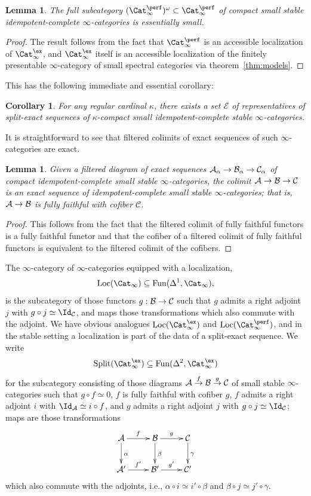 \documentclass{amsart}
\renewcommand{\to}{\mathchoice{\longrightarrow}{\rightarrow}{\rightarrow}{\rightarrow}}
\let\catsymbfont\mathcal
\newcommand{\aA}{{\catsymbfont{A}}}
\newcommand{\aB}{{\catsymbfont{B}}}
\newcommand{\aC}{{\catsymbfont{C}}}
\newcommand{\aE}{{\catsymbfont{E}}}
\newcommand{\stabcat}{\Cat_\i^{\ex}}
\newcommand{\idemstabcat}{\Cat_\i^{\perf}}
\newcommand{\Fun}{\mathrm{Fun}} %
\renewcommand{\i}{\infty}
\numberwithin{equation}{section}
\newtheorem{corollary}[equation]{Corollary}
\newtheorem{lemma}[equation]{Lemma}
\theoremstyle{definition}
\begin{document}
\begin{lemma}\label{lem:small}
The full subcategory
$(\idemstabcat)^{\omega} \subset \idemstabcat$ of compact small stable
idempotent-complete $\i$-categories is essentially small.
\end{lemma}

\begin{proof}
The result follows from the fact that $\idemstabcat$ is an accessible
localization of $\stabcat$, and $\stabcat$ itself is an
accessible localization of the finitely presentable $\i$-category of
small spectral categories via theorem~\ref{thm:models}.
\end{proof}

This has the following immediate and essential corollary:

\begin{corollary}\label{cor:setrep}
For any regular cardinal $\kappa$, there exists a set $\aE$ of
representatives of split-exact sequences of $\kappa$-compact small
idempotent-complete stable $\i$-categories.
\end{corollary}

It is straightforward to see that filtered colimits of exact sequences of such
$\i$-categories are exact. 

\begin{lemma}
Given a filtered diagram of exact sequences $\aA_\alpha\to \aB_\alpha\to
\aC_\alpha$ of compact idempotent-complete small stable $\i$-categories,
the colimit $\aA\to \aB\to \aC$ is an exact sequence of idempotent-complete
small stable $\i$-categories; that is, $\aA\to \aB$ is fully faithful with
cofiber $\aC$.
\end{lemma}

\begin{proof}
This follows from the fact that the filtered colimit of fully faithful
functors is a fully faithful functor and that the cofiber of a
filtered colimit of fully faithful functors is equivalent to the
filtered colimit of the cofibers.
\end{proof}

The $\i$-category of $\i$-categories equipped with a localization,
\[
\mathrm{Loc}(\Cat_\i)\subseteq\Fun(\Delta^1,\Cat_\i),
\]
is the subcategory of those functors $g:\aB\to\aC$ such that $g$ admits a right adjoint $j$ with $g\circ j\simeq\Id_\aC$, and maps those transformations which also commute with the adjoint.
We have obvious analogues $\mathrm{Loc}(\stabcat)$ and $\mathrm{Loc}(\idemstabcat)$, and in the stable setting a localization is part of the data of a split-exact sequence.
We write
\[
\mathrm{Split}(\stabcat)\subseteq\Fun(\Delta^2,\stabcat)
\]
for the subcategory consisting of those diagrams $\aA\overset{f}{\to}\aB\overset{g}{\to}\aC$ of small stable $\i$-categories such that $g\circ f\simeq 0$, $f$ is fully faithful with cofiber $g$, $f$ admits a right adjoint $i$ with $\Id_\aA\simeq i\circ f$, and $g$ admits a right adjoint $j$ with $g\circ j\simeq\Id_\aC$; maps are those transformations
\[
\xymatrix{
\aA\ar[r]^f\ar[d]^\alpha & \aB\ar[r]^g\ar[d]^\beta & \aC\ar[d]^\gamma\\
\aA'\ar[r]^{f'} & \aB'\ar[r]^{g'} & \aC'}
\]
which also commute with the adjoints, i.e., $\alpha\circ i\simeq i'\circ\beta$ and $\beta\circ j\simeq j'\circ\gamma$.
\end{document}

